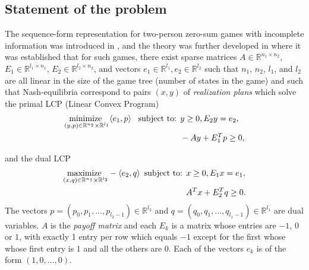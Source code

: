 \documentclass[a4paper,9pt]{extarticle}
\begin{document}
\subsection{Statement of the problem}

The sequence-form representation for two-person zero-sum games with
incomplete information was introduced in
\cite{koller1992complexity}, and the theory was further developed in
\cite{koller1994fast,von1996efficient,vonequilibrium} where it was
established that for such games, there exist sparse matrices
$A \in \mathbb{R}^{n_1 \times n_2}$, $E_1 \in \mathbb{R}^{l_1 \times
  n_1}$, $E_2 \in \mathbb{R}^{l_2 \times n_2}$, and vectors $e_1 \in
\mathbb{R}^{l_1}, e_2 \in \mathbb{R}^{l_2}$ such that $n_1$, $n_2$,
$l_1$, and $l_2$ are all linear in the size of the game tree (number
of states in the game) and such that Nash-equilibria correspond to
pairs $(x, y)$ of \textit{realization plans} which solve the primal
LCP (Linear Convex Program)
\begin{equation}
  \begin{aligned}
    \underset{(y,p) \in \mathbb{R}^{n_2} \times
     \mathbb{R}^{l_1}}{\text{minimize }}\langle e_1,
    p\rangle \hspace{.5em}\text{
       subject to: } &y \ge 0, E_2y = e_2,\\
    &-Ay + E_1^Tp \geq 0,
  \end{aligned}
  \label{eq:primal_pb}
\end{equation}

and the dual LCP
\begin{equation}
  \begin{aligned}
    \underset{(x,q) \in \mathbb{R}^{n_1} \times
      \mathbb{R}^{l_2}}{\text{maximize }}-\langle e_2,
    q\rangle\hspace{.5em}\text{subject
      to: } &x \ge
    0, E_1x = e_1,\\
    &A^Tx + E_2^Tq \geq 0.
  \end{aligned}
  \label{eq:dual_pb}
\end{equation}
The vectors $p = (p_0, p_1, ..., p_{l_2 - 1}) \in \mathbb{R}^{l_2}$
and $q = (q_0, q_1, ..., q_{l_1 - 1}) \in \mathbb{R}^{l_1}$ are dual
variables. 
$A$ is the \textit{payoff matrix} and each $E_k$ is a matrix whose
entries are $-1$, $0$ or $1$, with exactly 1 entry per row which
equals $-1$ except for the first whose whose first entry is $1$ and all
the others are $0$. Each of the vectors $e_k$ is of the form $(1, 0, ..., 0)$.
\end{document}
